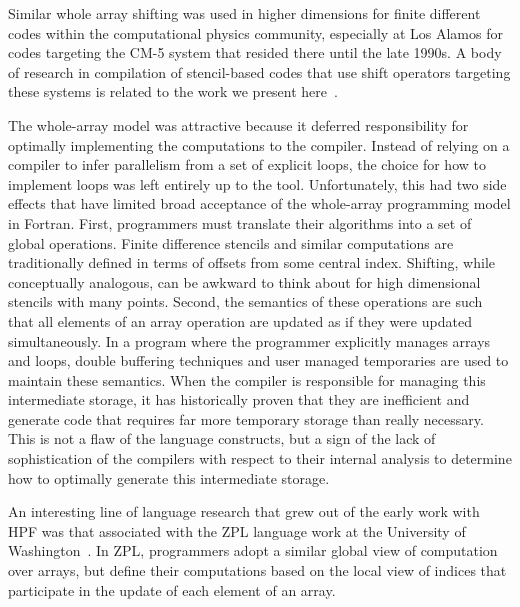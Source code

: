Similar whole array shifting was used in higher dimensions for finite
different codes within the computational physics community, especially
at Los Alamos for codes targeting the CM-5 system that resided there until the
late 1990s.  A body of research in compilation of stencil-based codes
that use shift operators targeting these systems is related to the
work we present here~\cite{stencil-compiler}.

The whole-array model was attractive because it deferred
responsibility for optimally implementing the computations to the
compiler.  Instead of relying on a compiler to infer parallelism from
a set of explicit loops, the choice for how to implement loops was
left entirely up to the tool.  Unfortunately, this had two side
effects that have limited broad acceptance of the whole-array
programming model in Fortran.  First, programmers must translate their
algorithms into a set of global operations.  Finite difference
stencils and similar computations are traditionally defined in terms
of offsets from some central index.  Shifting, while conceptually
analogous, can be awkward to think about for high dimensional stencils
with many points.  Second, the semantics of these operations are such
that all elements of an array operation are updated as if they were
updated simultaneously.  In a program where the programmer explicitly
manages arrays and loops, double buffering techniques and user managed
temporaries are used to maintain these semantics.  When the compiler
is responsible for managing this intermediate storage, it has
historically proven that they are inefficient and generate code that
requires far more temporary storage than really necessary.  This is
not a flaw of the language constructs, but a sign of the lack of
sophistication of the compilers with respect to their internal
analysis to determine how to optimally generate this intermediate
storage.

An interesting line of language research that grew out of the early work
with HPF was that associated with the ZPL language work at the University
of Washington~\cite{chamberlain04zpl}.  In ZPL, programmers adopt a similar
global view of computation over arrays, but define their computations based
on the local view of indices that participate in the update of each element of
an array.
